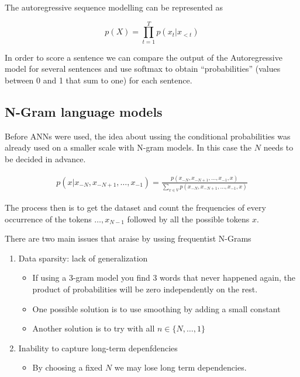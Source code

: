 \documentclass[b5paper]{report}
\begin{document}
The autoregressive sequence modelling can be represented as

\begin{equation}
  p(X) = \prod_{t=1}^T p(x_t|x_{<t})
\end{equation}

In order to score a sentence we can compare the output of the Autoregressive
model for several sentences and use softmax to obtain ``probabilities'' (values
between 0 and 1 that sum to one) for each sentence.

\subsection{N-Gram language models}

Before ANNs were used, the idea about ussing the conditional probabilities was
already used on a smaller scale with N-gram models. In this case the $N$ needs
to be decided in advance.

\begin{align}
  p(x|x_{-N},x_{-N+1},\dots,x_{-1}) = \frac{p(x_{-N},x_{-N+1},\dots,x_{-1}, x)} {\sum_{x \in V}p(x_{-N},x_{-N+1},\dots,x_{-1}, x)}
\end{align}

The process then is to get the dataset and count the frequencies of every
occurrence of the tokens $\dots,x_{N-1}$ followed by all the possible tokens
$x$.

There are two main issues that araise by ussing frequentist N-Grams

\begin{enumerate}
  \item Data sparsity: lack of generalization
    \begin{itemize}
      \item If using a 3-gram model you find 3 words that never happened again,
        the product of probabilities will be zero independently on the rest.
      \item One possible solution is to use smoothing by adding a small
        constant
      \item Another solution is to try with all $n \in \{N,\dots,1\}$
    \end{itemize}
  \item Inability to capture long-term depenfdencies
\begin{itemize}
  \item By choosing a fixed $N$ we may lose long term dependencies.
\end{itemize}
\end{enumerate}
\end{document}
